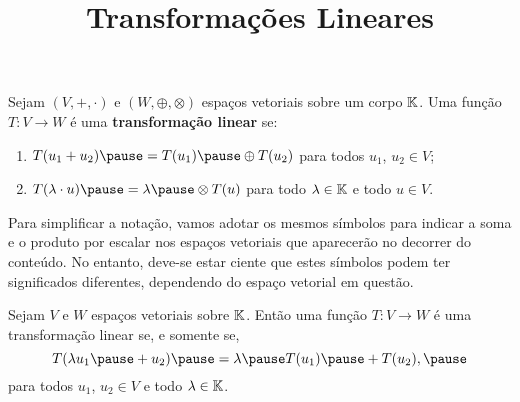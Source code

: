 \documentclass{beamer}
\title{Transformações Lineares}
\author[\autor]{\autor}
\institute[\instituto]{\instituto}
\date{}
\begin{document}
\begin{frame}
	\maketitle
\end{frame}


\begin{frame}
    \begin{definicao}
        Sejam $(V, +, \cdot)$ \pause e $(W, \oplus, \otimes)$ \pause espaços vetoriais sobre um corpo $\mathbb{K}$. \pause Uma função $T : V \to W$ \pause é uma \textbf{transformação linear} se:\pause
        \begin{enumerate}[label={\roman*})]
            \item $T(u_1 + u_2) \pause = T(u_1) \pause \oplus T(u_2)$ \pause para todos $u_1$, $u_2 \in V$;\pause

            \vspace*{1.5cm}

            \item $T(\lambda \cdot u) \pause = \lambda \pause \otimes T(u)$ \pause para todo $\lambda \in \mathbb{K}$ e todo $u \in V$.
        \end{enumerate}
    \end{definicao}
\end{frame}

\begin{frame}
    \begin{observacao}
        Para simplificar a notação, \pause vamos adotar os mesmos símbolos para indicar a soma \pause e o produto por escalar \pause nos espaços vetoriais que aparecerão no decorrer do conteúdo. \pause No entanto, deve-se estar ciente que estes símbolos podem ter significados diferentes, \pause dependendo do espaço vetorial em questão.
    \end{observacao}

    \begin{lema}
        Sejam $V$ e $W$ espaços vetoriais sobre $\mathbb{K}$. \pause Então uma função $T : V \to W$ \pause é uma transformação linear se, e somente se,\pause
        \[
            T(\lambda u_1 \pause + u_2) \pause = \lambda \pause T(u_1) \pause + T(u_2),\pause
        \]
        para todos $u_1$, $u_2 \in V$ \pause e todo $\lambda \in \mathbb{K}$.
    \end{lema}
\end{frame}
\end{document}
